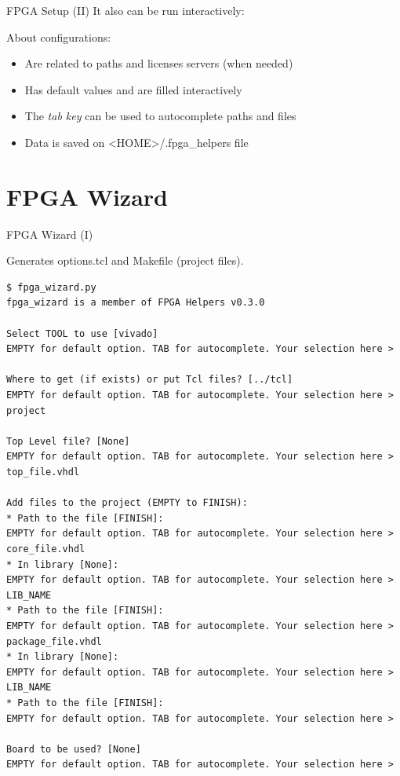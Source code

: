 \documentclass{beamer}
\begin{document}
\begin{frame}[fragile]{FPGA Setup (II)}
  It also can be run interactively:
  \scriptsize
  
  \normalsize
  About configurations:
  \begin{itemize}
    \item Are related to paths and licenses servers (when needed)
    \item Has default values and are filled interactively
    \item The \textit{tab key} can be used to autocomplete paths and files
    \item Data is saved on <HOME>/.fpga\_helpers file
  \end{itemize}
\end{frame}


\section{FPGA Wizard}

\begin{frame}[fragile]{FPGA Wizard (I)}
  \begin{block}{}
    Generates options.tcl and Makefile (project files).
  \end{block}{}
  \tiny
  \begin{verbatim}
$ fpga_wizard.py 
fpga_wizard is a member of FPGA Helpers v0.3.0

Select TOOL to use [vivado]
EMPTY for default option. TAB for autocomplete. Your selection here > 

Where to get (if exists) or put Tcl files? [../tcl]
EMPTY for default option. TAB for autocomplete. Your selection here > project

Top Level file? [None]
EMPTY for default option. TAB for autocomplete. Your selection here > top_file.vhdl

Add files to the project (EMPTY to FINISH):
* Path to the file [FINISH]:
EMPTY for default option. TAB for autocomplete. Your selection here > core_file.vhdl
* In library [None]:
EMPTY for default option. TAB for autocomplete. Your selection here > LIB_NAME
* Path to the file [FINISH]:
EMPTY for default option. TAB for autocomplete. Your selection here > package_file.vhdl
* In library [None]:
EMPTY for default option. TAB for autocomplete. Your selection here > LIB_NAME
* Path to the file [FINISH]:
EMPTY for default option. TAB for autocomplete. Your selection here > 

Board to be used? [None]
EMPTY for default option. TAB for autocomplete. Your selection here > 
  \end{verbatim}
\end{frame}
\end{document}
